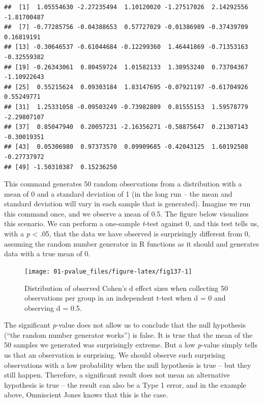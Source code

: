 \documentclass[
  oneside]{book}
\begin{document}
\begin{verbatim}
##  [1]  1.05554630 -2.27235494  1.10120020 -1.27517026  2.14292556 -1.81700487
##  [7] -0.77285756 -0.04388653  0.57727029 -0.01386989 -0.37439709  0.16819191
## [13] -0.30646537 -0.61044684 -0.12299360  1.46441869 -0.71353163 -0.32559382
## [19] -0.26343061  0.80459724  1.01582133  1.38953240  0.73704367 -1.10922643
## [25]  0.55215624  0.09303184  1.83147695 -0.07921197 -0.61704926  0.55249771
## [31]  1.25331058 -0.09503249 -0.73982809  0.81555153  1.59578779 -2.29807107
## [37]  0.85047940  0.20057231 -2.16356271 -0.58875647  0.21307143 -0.30019351
## [43]  0.05306980  0.97373570  0.09909685 -0.42043125  1.60192508 -0.27737972
## [49] -1.50310387  0.15236250
\end{verbatim}

This command generates 50 random observations from a distribution with a mean of 0 and a standard deviation of 1 (in the long run -- the mean and standard deviation will vary in each sample that is generated). Imagine we run this command once, and we observe a mean of 0.5. The figure below visualizes this scenario. We can perform a one-sample \emph{t}-test against 0, and this test tells us, with a \emph{p} \textless{} .05, that the data we have observed is surprisingly different from 0, assuming the random number generator in R functions as it should and generates data with a true mean of 0.

\begin{figure}

{\centering \texttt{[image: 01-pvalue\_files/figure-latex/fig137-1]} 

}

\caption{Distribution of observed Cohen's d effect sizes when collecting 50 observations per group in an independent t-test when d = 0 and observing d = 0.5.}\label{fig:fig137}
\end{figure}

The significant \emph{p}-value does not allow us to conclude that the null hypothesis (``the random number generator works'') is false. It is true that the mean of the 50 samples we generated was surprisingly extreme. But a low \emph{p}-value simply tells us that an observation is surprising. We should observe such surprising observations with a low probability when the null hypothesis is true -- but they still happen. Therefore, a significant result does not mean an alternative hypothesis is true -- the result can also be a Type 1 error, and in the example above, Omniscient Jones knows that this is the case.
\end{document}
